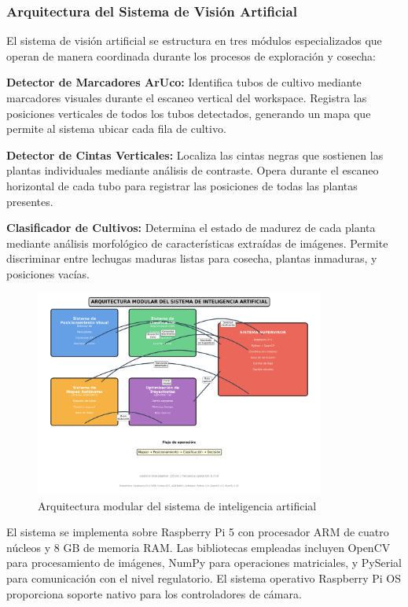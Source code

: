 \subsubsection{Arquitectura del Sistema de Visión Artificial}

El sistema de visión artificial se estructura en tres módulos especializados que operan de manera coordinada durante los procesos de exploración y cosecha:

\textbf{Detector de Marcadores ArUco:} Identifica tubos de cultivo mediante marcadores visuales durante el escaneo vertical del workspace. Registra las posiciones verticales de todos los tubos detectados, generando un mapa que permite al sistema ubicar cada fila de cultivo.

\textbf{Detector de Cintas Verticales:} Localiza las cintas negras que sostienen las plantas individuales mediante análisis de contraste. Opera durante el escaneo horizontal de cada tubo para registrar las posiciones de todas las plantas presentes.

\textbf{Clasificador de Cultivos:} Determina el estado de madurez de cada planta mediante análisis morfológico de características extraídas de imágenes. Permite discriminar entre lechugas maduras listas para cosecha, plantas inmaduras, y posiciones vacías.

\begin{figure}[h]
\centering
\includegraphics[width=0.85\textwidth]{imagenes/arquitectura_modular_ia.png}
\caption{Arquitectura modular del sistema de inteligencia artificial}
\label{fig:arquitectura_modular}
\end{figure}

El sistema se implementa sobre Raspberry Pi 5 con procesador ARM de cuatro núcleos y 8 GB de memoria RAM. Las bibliotecas empleadas incluyen OpenCV para procesamiento de imágenes, NumPy para operaciones matriciales, y PySerial para comunicación con el nivel regulatorio. El sistema operativo Raspberry Pi OS proporciona soporte nativo para los controladores de cámara.